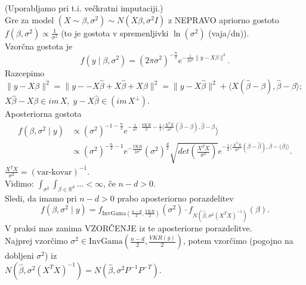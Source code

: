 \documentclass[a4paper, 12pt]{book}
\theoremstyle{definition}
\theoremstyle{remark}
\newcommand{\R}{\mathbb{R}}
\begin{document}
(Uporabljamo pri t.i. večkratni imputaciji.) \\
Gre za model $(X \sim \beta, \sigma^2) \sim N(X \beta, \sigma^2 I)$ z NEPRAVO apriorno gostoto \\
$f(\beta, \sigma^2) \propto \frac{1}{\sigma^2}$ (to je  gostota v spremenljivki $\ln (\sigma^2)$
(vaja/dn)). \\
Vzorčna gostota je
\begin{equation*}
  f(y \mid \beta, \sigma^2) = (2 \pi \sigma^2)^{-\frac{n}{2}} e^{-\frac{1}{2 \sigma^2} \lVert y - X \beta \rVert^2}.
\end{equation*}
Razcepimo \\
$\lVert y - X \beta\rVert^2 = \lVert y - - X \hat{\beta} + X \hat{\beta} + X \beta\rVert^2
= \lVert y - X \hat{\beta} \rVert^2 + \langle X (\hat{\beta} - \beta), \hat{\beta} - \beta \rangle$; \\
$X \hat{\beta} - X \beta \in im \, X, \; y - X \hat{\beta} \in (im \, X^{\bot})$. \\
Aposteriorna gostota
\begin{align*}
  f(\beta, \sigma^2 \mid y) &\propto
  (\sigma^2)^{-1-\frac{n}{2}} e^{-\frac{1}{\sigma^2} \cdot \frac{VKR}{2} -
    \frac{1}{2} \langle \frac{X^T X}{\sigma^2} (\hat{\beta} - \beta), \hat{\beta} - \beta} \rangle \\
  &\propto (\sigma^2)^{-\frac{n}{2}-1} e^{-\frac{VKR}{2 \sigma^2}} (\sigma^2)^{\frac{d}{2}}
    \sqrt{det\left(\frac{X^T X}{\sigma^2}\right)}
    e^{-\frac{1}{2} \langle \frac{X^T X}{\sigma^2} (\beta - \hat{\beta}), \beta - \hat(\beta)\rangle}.
\end{align*}
$\frac{X^T X}{\sigma^2} = (\text{var-kovar})^{-1}$. \\
Vidimo: $\int_{\sigma^2} \int_{\beta \in \R^d} \dots < \infty$, če $n-d > 0$. \\
Sledi, da imamo pri $n-d > 0$ prabo aposteriorno porazdelitev
\begin{equation*}
  f(\beta, \sigma^2 \mid y) = f_{\text{InvGama}\left(\frac{n-d}{2}, \frac{VKR}{2}\right)}(\sigma^2)
  \cdot f_{N(\hat{\beta}, \sigma^2 (X^T X)^{-1})}(\beta).
\end{equation*}
V praksi mas zanima VZORČENJE iz te aposteriorne porazdelitve. \\
Najprej vzorčimo $\sigma^2 \in \text{InvGama}\left(\frac{n-d}{2}, \frac{VKR(y)}{2}\right)$,
potem vzorčimo (pogojno na dobljeni $\sigma^2$) iz \\
$N(\hat{\beta}, \sigma^2 (X^T X)^{-1}) = N(\hat{\beta}, \sigma^2 P^{-1} P^{-T})$. \\
\end{document}
